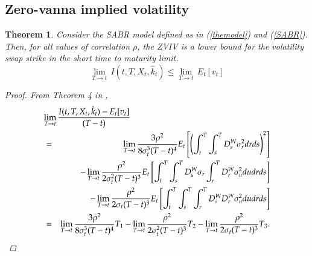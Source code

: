 \documentclass[11pt]{article}
\newtheorem{theorem}{Theorem}
\begin{document}

\subsection{Zero-vanna implied volatility}
\begin{theorem} Consider the SABR model defined as in (\ref{themodel}) and (\ref{SABR}). Then, for all values of correlation $\rho$, the ZVIV is a lower bound for the volatility swap strike in the short time to maturity limit.
\begin{equation}
\lim_{T \to t} \, I(t,T,X_t,\hat{k}_t) \leq \lim_{T \to t} \,  E_{t}[v_{t}]
\end{equation}
\begin{proof}
From Theorem 4 in \cite{ARS},
\begin{eqnarray}
\label{lim1}
\lefteqn{\lim_{T\rightarrow t}\frac{I( t,T,X_t,\hat{k}_t) -E_{t}[v_{t}]} {(T-t)}}\nonumber \\
&=& \lim_{T\rightarrow t}\frac{3\rho^{2}}{8\sigma _{t}^{3}(T-t)^{4}}
E_{t}\left[\left(\int_{t}^{T}\int_{s}^{T}D_{s}^{W}\sigma _{r}^{2}dr ds\right)^{2} \right]\nonumber\\
&&-\lim_{T\rightarrow t}\frac{\rho ^{2}}{{2\sigma _{t}^2(T-t)^{3}}}
E_{t}\left[ \int_{t}^{T} \int_{s}^{T}D_{s}^{W}\sigma_{r} \int_{r}^{T}D_{r}^{W}\sigma _{u}^{2}du dr ds\right]\nonumber\\
&&-\lim_{T\rightarrow t}\frac{\rho ^{2}}{2\sigma _{t}(T-t)^{3}}
E_{t}\left[\int_{t}^{T} \int_{s}^{T}\int_{r}^{T}D_{s}^{W}D_{r}^{W}\sigma _{u}^{2}du dr ds\right]\nonumber\\
&=& \lim_{T\rightarrow t}\frac{3\rho^{2}}{8\sigma _{t}^{3}(T-t)^{4}}T_1 - \lim_{T\rightarrow t}\frac{\rho ^{2}}{{2\sigma _{t}^2(T-t)^{3}}} T_2 - \lim_{T\rightarrow t}\frac{\rho ^{2}}{2\sigma _{t}(T-t)^{3}} T_3.
\end{eqnarray}

\end{proof}
\end{theorem}
\end{document}
